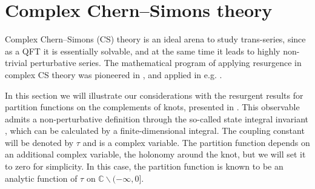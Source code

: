 \documentclass[a4paper,11pt]{article}
\theoremstyle{definition}
\def\IC{{\mathbb C}}
\begin{document}
\section{Complex Chern--Simons theory}
\label{sec-cs}

Complex Chern--Simons (CS) theory is an ideal arena to study trans-series, 
since as a QFT it is essentially solvable, and at the same time 
it leads to highly non-trivial perturbative series. The mathematical program of applying resurgence in 
complex CS theory was pioneered in \cite{garoufalidis}, and applied in e.g. \cite{garo-costin,gmp}. 

In this section we will illustrate our considerations with the resurgent 
results for partition functions on the complements of knots, presented in \cite{ggm1, ggm2}. This 
observable admits a non-perturbative definition through the so-called state integral invariant \cite{hikami, DGLZ, ak}, 
which can be calculated by a finite-dimensional integral. The coupling constant will be denoted by $\tau$ and is a 
complex variable. The partition function depends on an additional complex variable, the holonomy 
around the knot, but we will set it to zero for simplicity. In this case, the 
partition function is known to be an analytic function of $\tau$ on $\IC \backslash (-\infty, 0]$.  
\end{document}
